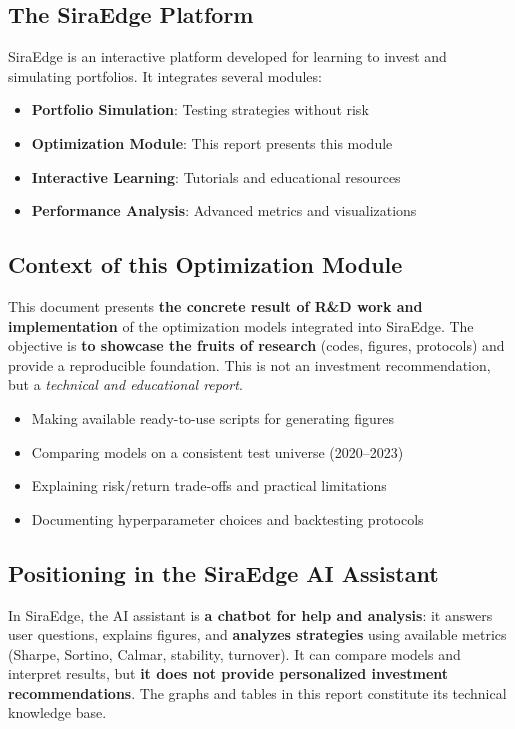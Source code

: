 \documentclass[11pt,a4paper]{article}
\begin{document}
\subsection*{The SiraEdge Platform}
SiraEdge is an interactive platform developed for learning to invest and simulating portfolios. It integrates several modules:
\begin{itemize}
    \item \textbf{Portfolio Simulation}: Testing strategies without risk
    \item \textbf{Optimization Module}: This report presents this module
    \item \textbf{Interactive Learning}: Tutorials and educational resources
    \item \textbf{Performance Analysis}: Advanced metrics and visualizations
\end{itemize}

\subsection*{Context of this Optimization Module}
This document presents \textbf{the concrete result of R\&D work and implementation} of the optimization models integrated into SiraEdge. The objective is \textbf{to showcase the fruits of research} (codes, figures, protocols) and provide a reproducible foundation. This is not an investment recommendation, but a \emph{technical and educational report}.

\begin{itemize}
    \item Making available ready-to-use scripts for generating figures
    \item Comparing models on a consistent test universe (2020--2023)
    \item Explaining risk/return trade-offs and practical limitations
    \item Documenting hyperparameter choices and backtesting protocols
\end{itemize}

\subsection*{Positioning in the SiraEdge AI Assistant}
In SiraEdge, the AI assistant is \textbf{a chatbot for help and analysis}: it answers user questions, explains figures, and \textbf{analyzes strategies} using available metrics (Sharpe, Sortino, Calmar, stability, turnover). It can compare models and interpret results, but \textbf{it does not provide personalized investment recommendations}. The graphs and tables in this report constitute its technical knowledge base.
\end{document}
